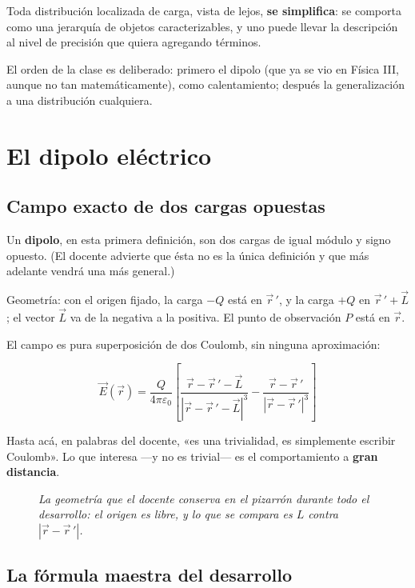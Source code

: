 \documentclass[12pt,a4paper]{article}
\begin{document}
\begin{keybox}
Toda distribución localizada de carga, vista de lejos, \textbf{se simplifica}: se
comporta como una jerarquía de objetos caracterizables, y uno puede llevar la
descripción al nivel de precisión que quiera agregando términos.
\end{keybox}

El orden de la clase es deliberado: primero el dipolo (que ya se vio en Física
III, aunque no tan matemáticamente), como calentamiento; después la
generalización a una distribución cualquiera.

\section{El dipolo eléctrico}

\subsection{Campo exacto de dos cargas opuestas}

Un \textbf{dipolo}, en esta primera definición, son dos cargas de igual módulo y
signo opuesto. (El docente advierte que ésta no es la única definición y que más
adelante vendrá una más general.)

Geometría: con el origen fijado, la carga $-Q$ está en $\vec r\,'$, y la carga
$+Q$ en $\vec r\,' + \vec L$; el vector $\vec L$ va de la negativa a la positiva.
El punto de observación $P$ está en $\vec r$.

El campo es pura superposición de dos Coulomb, sin ninguna aproximación:

\[
\vec E(\vec r) = \frac{Q}{4\pi\varepsilon_0}\left[
  \frac{\vec r - \vec r\,' - \vec L}{|\vec r - \vec r\,' - \vec L|^3}
  - \frac{\vec r - \vec r\,'}{|\vec r - \vec r\,'|^3}\right]
\]

Hasta acá, en palabras del docente, «es una trivialidad, es simplemente escribir
Coulomb». Lo que interesa ---y no es trivial--- es el comportamiento a
\textbf{gran distancia}.

\begin{figure}[H]
  \centering
  
  \caption*{\small\itshape La geometría que el docente conserva en el pizarrón
  durante todo el desarrollo: el origen es libre, y lo que se compara es $L$
  contra $|\vec r-\vec r\,'|$.}
\end{figure}

\subsection{La fórmula maestra del desarrollo}
\end{document}
